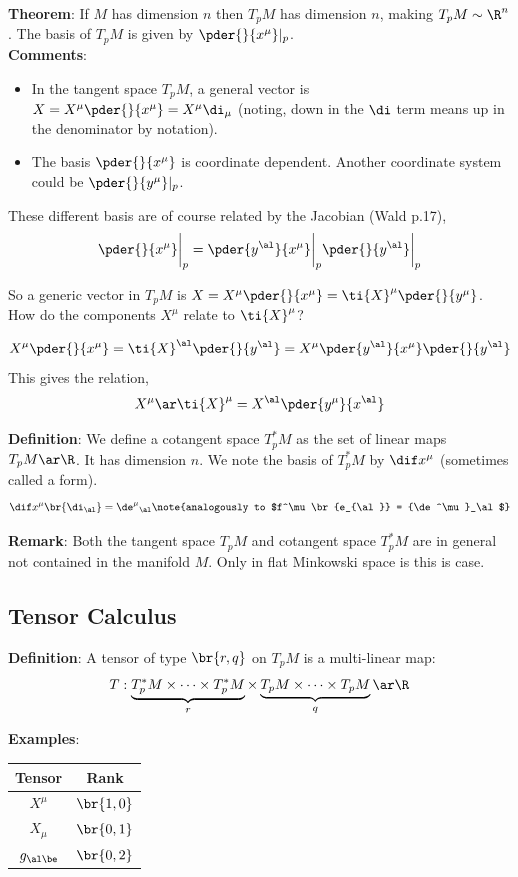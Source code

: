 \documentclass{article}
\begin{document}
\textbf{Theorem}: If $M$ has dimension $n$ then $T_pM$ has dimension $n$, making $T_pM \sim \R^n$. The basis of $T_pM$ is given by $\pder{}{x^\mu} |_p$.\\

\textbf{Comments}:
\begin{itemize}
    \item In the tangent space $T_pM$, a general vector is $X = X^\mu \pder{}{x^\mu} = X^\mu \di_\mu$ (noting, down in the $\di$ term means up in the denominator by notation).
    \item The basis $\pder{}{x^\mu}$ is coordinate dependent. Another coordinate system could be $\pder{}{y^\mu}|_p$.
\end{itemize}

These different basis are of course related by the Jacobian (Wald p.17),
\[ \pder{}{x^\mu}\bigg\rvert_p = \pder{y^\al}{x^\mu}\bigg\rvert_p \pder{}{y^\al}\bigg\rvert_p \]

So a generic vector in $T_pM$ is $X = X^\mu \pder{}{x^\mu} = \ti{X}^\mu \pder{}{y^\mu}$. How do the components $X^\mu$ relate to $\ti{X}^\mu$?

\[ X^\mu \pder{}{x^\mu} = \ti{X}^\al \pder{}{y^\al} = X^\mu \pder{y^\al}{x^\mu} \pder{}{y^\al} \]
This gives the relation,
\[ X^\mu \ar \ti{X}^\mu = X^\al \pder{y^\mu}{x^\al}\]

\textbf{Definition}: We define a cotangent space $T^*_pM$ as the set of linear maps $T_pM \ar \R$. It has dimension $n$. We note the basis of $T^*_pM$ by $\dif x^\mu$ (sometimes called a form).
\[ \dif x^\mu \br{\di_\al} = {\de^\mu}_\al \note{analogously to $f^\mu\br{e_{\al}} = {\de^\mu}_\al$} \]

\textbf{Remark}: Both the tangent space $T_pM$ and cotangent space $T^*_pM$ are in general not contained in the manifold $M$. Only in flat Minkowski space is this is case.

\subsection{Tensor Calculus}

\textbf{Definition}: A tensor of type $\br{r,q}$ on $T_pM$ is a multi-linear map:
\[ T: \underbrace{T^*_pM \times \cdots \times T^*_pM}_{r} \times \underbrace{T_pM \times \cdots \times T_pM}_{q} \ar \R \]

\textbf{Examples}:
\begin{center}
\begin{tabular}{|c|c|}
    \hline
    Tensor & Rank \\
    \hline
    $X^\mu$ & $\br{1,0}$ \\
    $X_\mu$ & $\br{0,1}$ \\
    $g_{\al\be}$ & $\br{0,2}$ \\
    \hline
\end{tabular}
\end{center}
\end{document}
